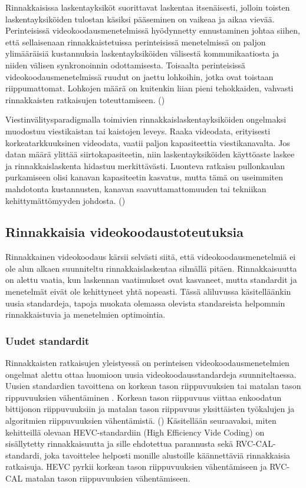 Rinnakkaisissa laskentayksiköt suorittavat laskentaa itsenäisesti, jolloin
toisten laskentayksiköiden tulostan käsiksi pääseminen on vaikeaa ja
aikaa vievää. Perinteisissä videokoodausmenetelmissä hyödynnetty ennustaminen
johtaa siihen, että sellaisenaan rinnakkaistetuissa perinteisissä menetelmissä
on paljon ylimääräisiä kustannuksia laskentayksiköiden välisestä
kommunikaatiosta ja niiden välisen synkronoinnin odottamisesta. Toisaalta
perinteisissä videokoodausmenetelmissä ruudut on jaettu lohkoihin, jotka ovat
toistaan riippumattomat. Lohkojen määrä on kuitenkin liian pieni tehokkaiden,
vahvasti rinnakkaisten ratkaisujen toteuttamiseen. (\citealt{pieters})

Viestinvälitysparadigmalla toimivien rinnakkaislaskentayksiköiden ongelmaksi
muodostuu viestikaistan tai kaistojen leveys. Raaka videodata, erityisesti
korkeatarkkuuksinen videodata, vaatii paljon kapasiteettia viestikanavalta. Jos
datan määrä ylittää siirtokapasiteetin, niin laskentayksiköiden käyttöaste
laskee ja rinnakkaislaskenta hidastuu merkittävästi. Luonteva ratkaisu
pullonkaulan purkamiseen olisi kanavan kapasiteetin kasvatus, mutta tämä on
useimmiten mahdotonta kustannusten, kanavan saavuttamattomuuden tai tekniikan
kehittymättömyyden johdosta. (\citealt{li})

\subsection{Rinnakkaisia videokoodaustoteutuksia}

Rinnakkainen videokoodaus kärsii selvästi siitä, että
videokoodausmenetelmiä ei ole alun alkaen suunniteltu rinnakkaislaskentaa
silmällä pitäen. Rinnakkaisuutta on alettu vaatia, kun laskennan vaatimukset
ovat kasvaneet, mutta standardit ja menetelmät eivät ole kehittyneet
yhtä nopeasti. Tässä aliluvussa käsitelläänkin uusia standardeja, tapoja
muokata olemassa olevista standareista helpommin rinnakkaistuvia ja menetelmien
optimointia.

\subsubsection{Uudet standardit}

Rinnakkaisten ratkaisujen yleistyessä on perinteisen videokoodausmenetelmien
ongelmat alettu ottaa huomioon uusia
videokoodausstandardeja suunniteltaessa. Uusien standardien tavoittena on korkean
tason riippuvuuksien tai matalan tason rippuvuuksien vähentäminen . Korkean
tason riippuvuus viittaa enkoodatun bittijonon riippuvuuksiin ja matalan
tason riippuvuus yksittäisten työkalujen ja algoritmien riippuvuuksien
vähentämistä. (\citealt{choi}) Käsitellään seuraavaksi, miten kehitteillä
olevaan HEVC-standardiin (High Efficiency Vide Coding) on sisällytetty rinnakkaisuutta ja sille ehdotettua
parannusta sekä RVC-CAL-standardi, joka tavoittelee helposti monille alustoille
käännettäviä rinnakkaisia ratkaisuja. HEVC pyrkii korkean tason riippuvuuksien
vähentämiseen ja RVC-CAL matalan tason riippuvuuksien vähentämiseen.

